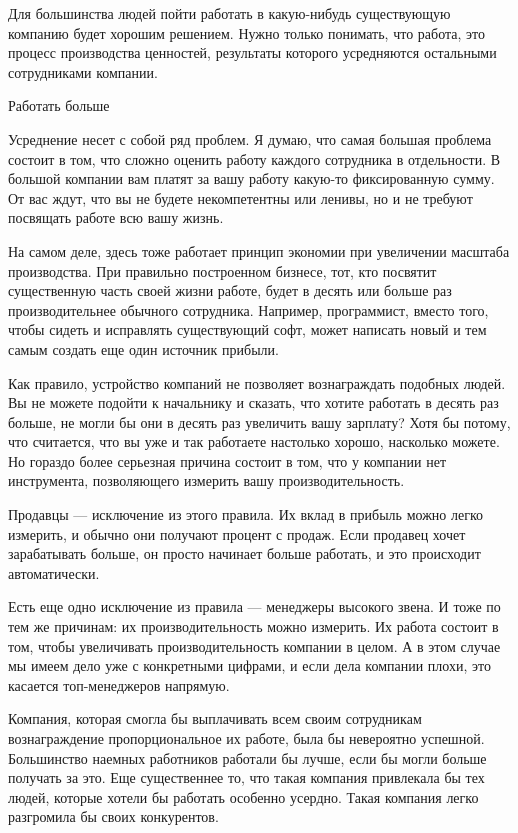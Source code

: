 \documentclass[ebook,12pt,oneside,openany]{memoir}
\begin{document}
Для большинства людей пойти работать в какую-нибудь существующую
компанию будет хорошим решением. Нужно только понимать, что работа,
это процесс производства ценностей, результаты которого усредняются
остальными сотрудниками компании.

Работать больше

Усреднение несет с собой ряд проблем. Я думаю, что самая большая
проблема состоит в том, что сложно оценить работу каждого сотрудника в
отдельности. В большой компании вам платят за вашу работу какую-то
фиксированную сумму. От вас ждут, что вы не будете некомпетентны или
ленивы, но и не требуют посвящать работе всю вашу жизнь.

На самом деле, здесь тоже работает принцип экономии при увеличении
масштаба производства. При правильно построенном бизнесе, тот, кто
посвятит существенную часть своей жизни работе, будет в десять или
больше раз производительнее обычного сотрудника. Например,
программист, вместо того, чтобы сидеть и исправлять существующий софт,
может написать новый и тем самым создать еще один источник прибыли.

Как правило, устройство компаний не позволяет вознаграждать подобных
людей. Вы не можете подойти к начальнику и сказать, что хотите
работать в десять раз больше, не могли бы они в десять раз увеличить
вашу зарплату? Хотя бы потому, что считается, что вы уже и так
работаете настолько хорошо, насколько можете. Но гораздо более
серьезная причина состоит в том, что у компании нет инструмента,
позволяющего измерить вашу производительность.

Продавцы — исключение из этого правила. Их вклад в прибыль можно легко
измерить, и обычно они получают процент с продаж. Если продавец хочет
зарабатывать больше, он просто начинает больше работать, и это
происходит автоматически.

Есть еще одно исключение из правила — менеджеры высокого звена. И тоже
по тем же причинам: их производительность можно измерить. Их работа
состоит в том, чтобы увеличивать производительность компании в целом.
А в этом случае мы имеем дело уже с конкретными цифрами, и если дела
компании плохи, это касается топ-менеджеров напрямую.

Компания, которая смогла бы выплачивать всем своим сотрудникам
вознаграждение пропорциональное их работе, была бы невероятно
успешной. Большинство наемных работников работали бы лучше, если бы
могли больше получать за это. Еще существеннее то, что такая компания
привлекала бы тех людей, которые хотели бы работать особенно усердно.
Такая компания легко разгромила бы своих конкурентов.
\end{document}
